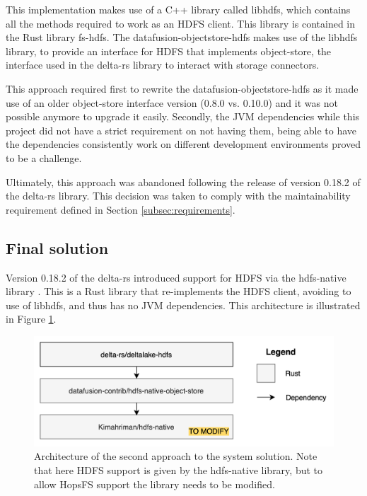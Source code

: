 This implementation makes use of a C++ library called libhdfs, which contains all the methods required to work as an \gls{HDFS} client. This library is contained in the Rust library fs-hdfs. The datafusion-objectstore-hdfs makes use of the libhdfs library, to provide an interface for \gls{HDFS} that implements object-store, the interface used in the delta-rs library to interact with storage connectors.

This approach required first to rewrite the datafusion-objectstore-hdfs as it made use of an older object-store interface version (0.8.0 vs. 0.10.0) and it was not possible anymore to upgrade it easily. Secondly, the \gls{JVM} dependencies while this project did not have a strict requirement on not having them, being able to have the dependencies consistently work on different development environments proved to be a challenge. 

Ultimately, this approach was abandoned following the release of version 0.18.2 of the delta-rs library. This decision was taken to comply with the maintainability requirement defined in Section \ref{subsec:requirements}.

\subsection{Final solution}

Version 0.18.2 of the delta-rs introduced support for \gls{HDFS} via the hdfs-native library \cite{binfordKimahrimanHdfsnative2024}. This is a Rust library that re-implements the \gls{HDFS} client, avoiding to use of libhdfs, and thus has no \gls{JVM} dependencies. This architecture is illustrated in Figure \ref{fig:approach_2_solution_schema}.

\begin{figure}[!ht]
  \begin{center}
    \includegraphics[width=\textwidth]{figures/4-implementation/hdfs-native.png}
  \caption{Architecture of the second approach to the system solution. Note that here \gls{HDFS} support is given by the hdfs-native library, but to allow \gls{HopsFS} support the library needs to be modified.}
  \label{fig:approach_2_solution_schema}
  \end{center}
\end{figure}

